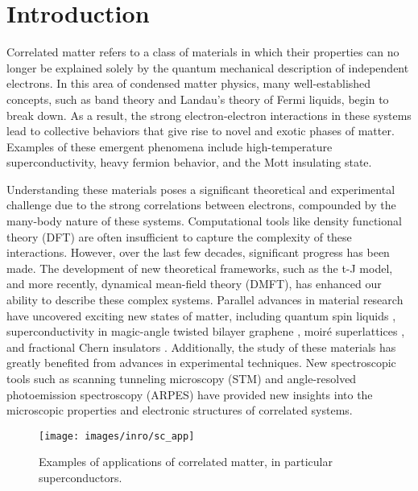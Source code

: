 \cleardoublepage
\chapter*{Introduction}


Correlated matter refers to a class of materials in which their properties can no longer be explained solely by the quantum mechanical description of independent electrons.
In this area of condensed matter physics, many well-established concepts, such as band theory \cite{bethe_theorie_1928,sommerfeld_zur_1928,bloch_bemerkung_1929} and Landau’s theory of Fermi liquids, begin to break down.
As a result, the strong electron-electron interactions in these systems lead to collective behaviors that give rise to novel and exotic phases of matter.
Examples of these emergent phenomena include high-temperature superconductivity, heavy fermion behavior, and the Mott insulating state.

Understanding these materials poses a significant theoretical and experimental challenge due to the strong correlations between electrons, compounded by the many-body nature of these systems.
Computational tools like density functional theory (DFT) are often insufficient to capture the complexity of these interactions.
However, over the last few decades, significant progress has been made.
The development of new theoretical frameworks, such as the t-J model, and more recently, dynamical mean-field theory (DMFT), has enhanced our ability to describe these complex systems.
Parallel advances in material research have uncovered exciting new states of matter, including quantum spin liquids \cite{broholm_quantum_2020}, superconductivity in magic-angle twisted bilayer graphene \cite{oh_evidence_2021}, moiré superlattices \cite{andrei_marvels_2021}, and fractional Chern insulators \cite{zeng_thermodynamic_2023}.
Additionally, the study of these materials has greatly benefited from advances in experimental techniques.
New spectroscopic tools such as scanning tunneling microscopy (STM) and angle-resolved photoemission spectroscopy (ARPES) have provided new insights into the microscopic properties and electronic structures of correlated systems.
\begin{figure}
	\centering
	\texttt{[image: images/inro/sc\_app]}
	\caption{Examples of applications of correlated matter, in particular superconductors.}
	\label{fig:scapp}
\end{figure}

